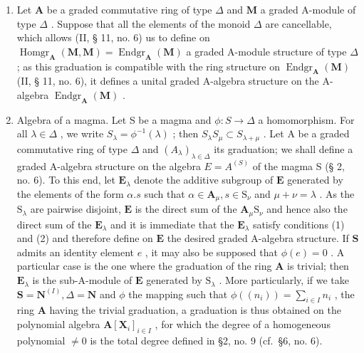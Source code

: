 \begin{enumerate}
\def\labelenumi{(\arabic{enumi})}
\setcounter{enumi}{1}
\item
  Let \(\mathbf{A}\) be a graded commutative ring of type \(\Delta\) and \(\mathbf{M}\) a graded A-module of type \(\Delta\) . Suppose that all the elements of the monoid \(\Delta\) are cancellable, which allows (II, § 11, no. 6) us to define on \(\operatorname{Homgr}_{\mathbf{A}}(\mathbf{M}, \mathbf{M}) = \operatorname{Endgr}_{\mathbf{A}}(\mathbf{M})\) a graded A-module structure of type \(\Delta\) ; as this graduation is compatible with the ring structure on \(\operatorname{Endgr}_{\mathbf{A}}(\mathbf{M})\) (II, § 11, no. 6), it defines a unital graded A-algebra structure on the A-algebra \(\operatorname{Endgr}_{\mathbf{A}}(\mathbf{M})\) .
\item
  Algebra of a magma. Let S be a magma and \(\phi: S \to \Delta\) a homomorphism. For all \(\lambda \in \Delta\) , we write \(S_{\lambda} = \phi^{-1}(\lambda)\) ; then \(S_{\lambda}S_{\mu} \subset S_{\lambda + \mu}\) . Let A be a graded commutative ring of type \(\Delta\) and \((A_{\lambda})_{\lambda \in \Delta}\) its graduation; we shall define a graded A-algebra structure on the algebra \(E = A^{(S)}\) of the magma S (§ 2, no. 6). To this end, let \(\mathbf{E}_{\lambda}\) denote the additive subgroup of \(\mathbf{E}\) generated by the elements of the form \(\alpha .s\) such that \(\alpha \in \mathbf{A}_{\mu}, s \in \mathrm{S}_{\nu}\) and \(\mu + \nu = \lambda\) . As the \(\mathrm{S}_{\lambda}\) are pairwise disjoint, \(\mathbf{E}\) is the direct sum of the \(\mathbf{A}_{\mu}\mathrm{S}_{\nu}\) and hence also the direct sum of the \(\mathbf{E}_{\lambda}\) and it is immediate that the \(\mathbf{E}_{\lambda}\) satisfy conditions (1) and (2) and therefore define on \(\mathbf{E}\) the desired graded A-algebra structure. If \(\mathbf{S}\) admits an identity element \(e\) , it may also be supposed that \(\phi(e) = 0\) . A particular case is the one where the graduation of the ring \(\mathbf{A}\) is trivial; then \(\mathbf{E}_{\lambda}\) is the sub-A-module of \(\mathbf{E}\) generated by \(\mathrm{S}_{\lambda}\) . More particularly, if we take \(\mathbf{S} = \mathbf{N}^{(I)}, \Delta = \mathbf{N}\) and \(\phi\) the mapping such that \(\phi((n_{i})) = \sum_{i \in I} n_{i}\) , the ring \(\mathbf{A}\) having the trivial graduation, a graduation is thus obtained on the polynomial algebra \(\mathbf{A}[\mathbf{X}_{i}]_{i \in I}\) , for which the degree of a homogeneous polynomial \(\neq 0\) is the total degree defined in §2, no. 9 (cf.~§6, no. 6).
\end{enumerate}

